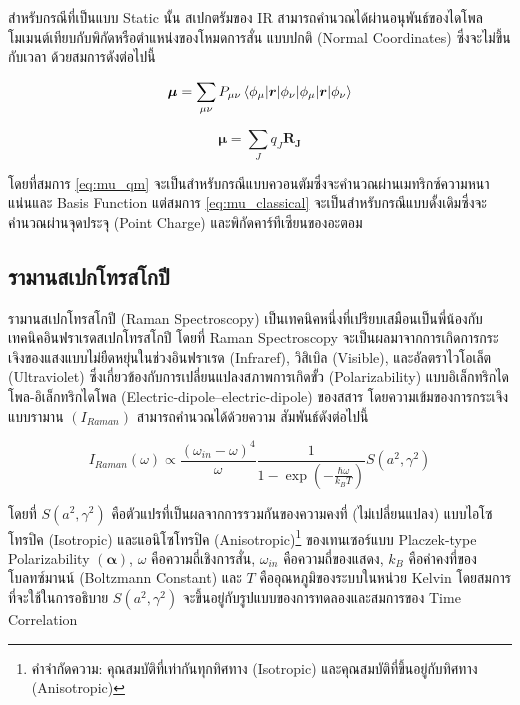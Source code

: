 สำหรับกรณีที่เป็นแบบ Static นั้น สเปกตรัมของ IR สามารถคำนวณได้ผ่านอนุพันธ์ของไดโพลโมเมนต์เทียบกับพิกัดหรือตำแหน่งของโหมดการสั่น%
แบบปกติ (Normal Coordinates) ซึ่งจะไม่ขึ้นกับเวลา ด้วยสมการดังต่อไปนี้

\begin{equation}\label{eq:mu_qm}
    \bm{\mu} = \sum_{\mu\nu} P_{\mu\nu} \braket{\phi_{\mu}|\bm{r}|\phi_{\nu}}
\end{equation}

\begin{equation}\label{eq:mu_classical}
    \bm{\mu} = \sum_{J} q_J \bm{R_J}
\end{equation}

โดยที่สมการ \eqref{eq:mu_qm} จะเป็นสำหรับกรณีแบบควอนตัมซึ่งจะคำนวณผ่านเมทริกซ์ความหนาแน่นและ Basis Function แต่สมการ
\eqref{eq:mu_classical} จะเป็นสำหรับกรณีแบบดั้งเดิมซึ่งจะคำนวณผ่านจุดประจุ (Point Charge) และพิกัดคาร์ทีเซียนของอะตอม

\subsection{รามานสเปกโทรสโกปี}
\label{ssec:raman_spectro}

รามานสเปกโทรสโกปี (Raman Spectroscopy) เป็นเทคนิคหนึ่งที่เปรียบเสมือนเป็นพี่น้องกับเทคนิคอินฟราเรดสเปกโทรสโกปี โดยที่ Raman
Spectroscopy จะเป็นผลมาจากการเกิดการกระเจิงของแสงแบบไม่ยืดหยุ่นในช่วงอินฟราเรด (Infraref), วิสิเบิล (Visible), และอัลตราไวโอเล็ต
(Ultraviolet) ซึ่งเกี่ยวข้องกับการเปลี่ยนแปลงสภาพการเกิดขั้ว (Polarizability) แบบอิเล็กทริกไดโพล-อิเล็กทริกไดโพล
(Electric-dipole--electric-dipole) ของสสาร โดยความเข้มของการกระเจิงแบบรามาน $(I_{Raman})$ สามารถคำนวณได้ด้วยความ%
สัมพันธ์ดังต่อไปนี้\autocite{thomas2013}

\begin{equation}\label{eq:Raman_corr}
    I_{Raman} (\omega) \propto \frac{(\omega_{in}-\omega)^4}{\omega}
    \frac{1}{1-\exp(-\frac{\hbar\omega}{k_{B}T})}S(a^{2}, \gamma^{2})
\end{equation}

\noindent โดยที่ $S(a^{2}, \gamma^{2})$ คือตัวแปรที่เป็นผลจากการรวมกันของความคงที่ (ไม่เปลี่ยนแปลง) แบบไอโซโทรปิค (Isotropic)
และแอนิโซโทรปิค (Anisotropic)\footnote{คำจำกัดความ: คุณสมบัติที่เท่ากันทุกทิศทาง (Isotropic) และคุณสมบัติที่ขึ้นอยู่กับทิศทาง
    (Anisotropic)} ของเทนเซอร์แบบ Placzek-type Polarizability $(\bm{\alpha})$\autocite{jensen2005}, $\omega$
คือความถี่เชิงการสั่น, $\omega_{in}$ คือความถี่ของแสดง, $k_{B}$ คือค่าคงที่ของโบลทซ์มานน์ (Boltzmann Constant) และ $T$
คืออุณหภูมิของระบบในหน่วย Kelvin โดยสมการที่จะใช้ในการอธิบาย $S(a^{2}, \gamma^{2})$ จะขึ้นอยู่กับรูปแบบของการทดลองและสมการของ
Time Correlation\autocite{mattiat2021}

